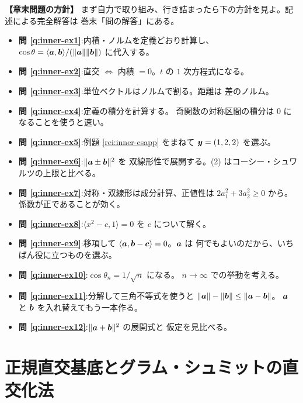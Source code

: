 \bigskip
{\small
\noindent\textbf{【章末問題の方針】}\quad
まず自力で取り組み、行き詰まったら下の方針を見よ。記述による完全解答は
巻末「問の解答」にある。
\begin{itemize}
\item \textbf{問 \ref{q:inner-ex1}}:内積・ノルムを定義どおり計算し、
$\cos\theta = \langle \bm{a}, \bm{b} \rangle / (\|\bm{a}\|\|\bm{b}\|)$
に代入する。
\item \textbf{問 \ref{q:inner-ex2}}:直交 $\iff$ 内積 $= 0$。$t$ の
$1$ 次方程式になる。
\item \textbf{問 \ref{q:inner-ex3}}:単位ベクトルはノルムで割る。距離は
差のノルム。
\item \textbf{問 \ref{q:inner-ex4}}:定義の積分を計算する。
奇関数の対称区間の積分は $0$ になることを使うと速い。
\item \textbf{問 \ref{q:inner-ex5}}:例題 \ref{rei:inner-csapp} をまねて
$\bm{y} = (1, 2, 2)$ を選ぶ。
\item \textbf{問 \ref{q:inner-ex6}}:$\|\bm{a} \pm \bm{b}\|^2$ を
双線形性で展開する。(2) はコーシー・シュワルツの上限と比べる。
\item \textbf{問 \ref{q:inner-ex7}}:対称・双線形は成分計算、正値性は
$2a_1^2 + 3a_2^2 \ge 0$ から。係数が正であることが効く。
\item \textbf{問 \ref{q:inner-ex8}}:$\langle x^2 - c, 1 \rangle = 0$ を
$c$ について解く。
\item \textbf{問 \ref{q:inner-ex9}}:移項して
$\langle \bm{a}, \bm{b} - \bm{c} \rangle = 0$。$\bm{a}$ は
何でもよいのだから、いちばん役に立つものを選ぶ。
\item \textbf{問 \ref{q:inner-ex10}}:$\cos\theta_n = 1/\sqrt{n}$ になる。
$n \to \infty$ での挙動を考える。
\item \textbf{問 \ref{q:inner-ex11}}:分解して三角不等式を使うと
$\|\bm{a}\| - \|\bm{b}\| \le \|\bm{a} - \bm{b}\|$。
$\bm{a}$ と $\bm{b}$ を入れ替えてもう一本作る。
\item \textbf{問 \ref{q:inner-ex12}}:$\|\bm{a} + \bm{b}\|^2$ の展開式と
仮定を見比べる。
\end{itemize}
}

\chapter{正規直交基底とグラム・シュミットの直交化法}\label{chap:gs}

